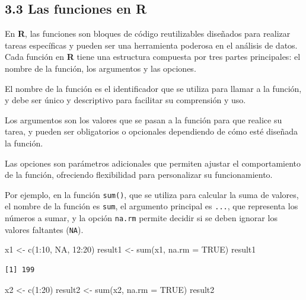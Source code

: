 \documentclass[
  letterpaper,
  DIV=11,
  numbers=noendperiod]{scrreprt}
\newenvironment{Shaded}{\begin{snugshade}}{\end{snugshade}}
\newcommand{\AttributeTok}[1]{\textcolor[rgb]{0.40,0.45,0.13}{#1}}
\newcommand{\ConstantTok}[1]{\textcolor[rgb]{0.56,0.35,0.01}{#1}}
\newcommand{\DecValTok}[1]{\textcolor[rgb]{0.68,0.00,0.00}{#1}}
\newcommand{\FunctionTok}[1]{\textcolor[rgb]{0.28,0.35,0.67}{#1}}
\newcommand{\NormalTok}[1]{\textcolor[rgb]{0.00,0.23,0.31}{#1}}
\newcommand{\OtherTok}[1]{\textcolor[rgb]{0.00,0.23,0.31}{#1}}
\newcommand{\SpecialCharTok}[1]{\textcolor[rgb]{0.37,0.37,0.37}{#1}}
\begin{document}
\hypertarget{las-funciones-en-r}{%
\subsection{3.3 Las funciones en R}\label{las-funciones-en-r}}

En \textbf{R}, las funciones son bloques de código reutilizables
diseñados para realizar tareas específicas y pueden ser una herramienta
poderosa en el análisis de datos. Cada función en \textbf{R} tiene una
estructura compuesta por tres partes principales: el nombre de la
función, los argumentos y las opciones.

El nombre de la función es el identificador que se utiliza para llamar a
la función, y debe ser único y descriptivo para facilitar su comprensión
y uso.

Los argumentos son los valores que se pasan a la función para que
realice su tarea, y pueden ser obligatorios o opcionales dependiendo de
cómo esté diseñada la función.

Las opciones son parámetros adicionales que permiten ajustar el
comportamiento de la función, ofreciendo flexibilidad para personalizar
su funcionamiento.

Por ejemplo, en la función \texttt{sum()}, que se utiliza para calcular
la suma de valores, el nombre de la función es \texttt{sum}, el
argumento principal es \texttt{...}, que representa los números a sumar,
y la opción \texttt{na.rm} permite decidir si se deben ignorar los
valores faltantes (\texttt{NA}).

\begin{Shaded}
\begin{Highlighting}[]
\NormalTok{x1 }\OtherTok{\textless{}{-}} \FunctionTok{c}\NormalTok{(}\DecValTok{1}\SpecialCharTok{:}\DecValTok{10}\NormalTok{, }\ConstantTok{NA}\NormalTok{, }\DecValTok{12}\SpecialCharTok{:}\DecValTok{20}\NormalTok{)}
\NormalTok{result1 }\OtherTok{\textless{}{-}} \FunctionTok{sum}\NormalTok{(x1, }\AttributeTok{na.rm =} \ConstantTok{TRUE}\NormalTok{)}
\NormalTok{result1}
\end{Highlighting}
\end{Shaded}

\begin{verbatim}
[1] 199
\end{verbatim}

\begin{Shaded}
\begin{Highlighting}[]
\NormalTok{x2 }\OtherTok{\textless{}{-}} \FunctionTok{c}\NormalTok{(}\DecValTok{1}\SpecialCharTok{:}\DecValTok{20}\NormalTok{)}
\NormalTok{result2 }\OtherTok{\textless{}{-}} \FunctionTok{sum}\NormalTok{(x2, }\AttributeTok{na.rm =} \ConstantTok{TRUE}\NormalTok{)}
\NormalTok{result2}
\end{Highlighting}
\end{Shaded}
\end{document}
